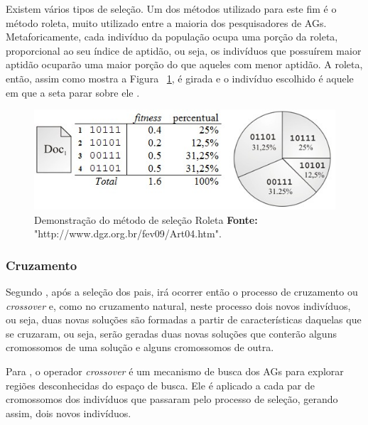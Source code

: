 \par Existem vários tipos de seleção. Um dos métodos utilizado para este fim é o método
roleta, muito utilizado entre a maioria dos pesquisadores de AGs. Metaforicamente, 
cada indivíduo da população ocupa uma porção da roleta, proporcional ao seu índice 
de aptidão, ou seja, os indivíduos que possuírem maior aptidão ocuparão uma maior 
porção do que aqueles com menor aptidão. A roleta, então, assim como mostra a
Figura ~\ref{fig:metodo_selecao_roleta}, é girada e o indivíduo escolhido é
aquele em que a seta parar sobre ele \cite{REVISTA_MULTIDISCIPLINAR_DA_UNIESP}.


\begin{figure}[h!]
	\centerline{\includegraphics[scale=1.0]{./imagens/roleta.jpg}}
	\caption[Demonstração do método de seleção Roleta]
	{Demonstração do método de seleção Roleta \textbf{Fonte:}
	"http://www.dgz.org.br/fev09/Art04.htm".}
	\label{fig:metodo_selecao_roleta}
\end{figure}



\subsubsection{Cruzamento} 

\par Segundo , após a seleção dos pais, irá
ocorrer então o processo de cruzamento ou \textit{crossover} e, como no cruzamento natural, neste processo dois novos indivíduos, ou seja, duas
novas soluções são formadas a partir de características daquelas que se
cruzaram, ou seja, serão geradas duas novas soluções que conterão alguns cromossomos
de uma solução e alguns cromossomos de outra.

\par Para , o operador
\textit{crossover} é um mecanismo de busca dos AGs para explorar regiões
desconhecidas do espaço de busca. Ele é aplicado a cada par de cromossomos dos
indivíduos que passaram pelo processo de seleção, gerando assim, dois novos
indivíduos.

